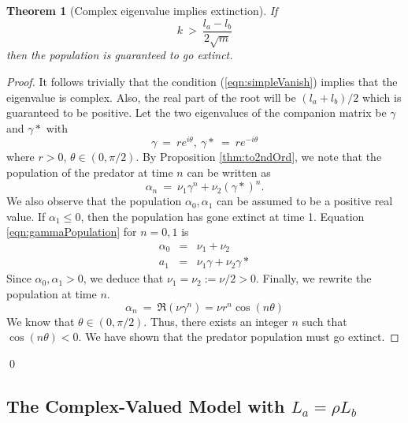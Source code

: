 \documentclass[11pt,reqno]{amsart}
\numberwithin{equation}{section}
\theoremstyle{plain}
\newtheorem{theorem}[thm]{Theorem}
\begin{document}
\begin{theorem}[Complex eigenvalue implies extinction]
If 
\begin{equation}\label{eqn:simpleVanish}
    k \ > \  \frac {l_a - l_b} {2\sqrt{m}}
\end{equation}
then the population is guaranteed to go extinct. 
\end{theorem}
\begin{proof}
    It follows trivially that the condition (\ref{eqn:simpleVanish}) 
    implies that the eigenvalue is complex. Also, the real part of the root will be $(l_a + l_b)/2$ which is guaranteed to be positive. Let the two eigenvalues of the companion matrix be $\gamma$ and $\gamma *$ with 
    \begin{equation}
    \gamma \ = \ r e^{i \theta} ,\ \gamma* \ = \ r e^{-i \theta} 
    \end{equation}
    where $r > 0$,
    $\theta \in (0, \pi/2)$. By Proposition \ref{thm:to2ndOrd}, we note that the population of 
    the predator at time $n$ can be written as 
    \begin{equation}\label{eqn:gammaPopulation}
    \alpha_n \ = \ \nu_1 \gamma^n + \nu_2 (\gamma*)^n.
    \end{equation}
    We also observe that the population $\alpha_0, \alpha_1$ can be assumed to be a positive real value. If $\alpha_1 \leq 0$, then the population has gone extinct at time 1. 
    Equation \ref{eqn:gammaPopulation} for $n = 0, 1$ is 
    \begin{eqnarray}
    \alpha_0 & = & \nu_1 + \nu_2 \nonumber\\ 
    a_1 & = & \nu_1\gamma + \nu_2\gamma*
    \end{eqnarray}
    Since $\alpha_0, \alpha_1 > 0$, we deduce that $\nu_1 = \nu_2 := \nu/2 > 0$. Finally, we rewrite the population at time $n$. 
    \begin{equation}
    \alpha_n \ = \ \Re (\nu \gamma ^n) = \nu r^n \cos(n\theta)
    \end{equation}
    We know that $\theta \in (0, \pi / 2)$. Thus, there exists 
    an integer $n$ such that $\cos(n\theta) < 0$. We have shown that the predator population must go extinct. 
\end{proof}
\hfill \qed

\subsection{The Complex-Valued Model with $L_a = \rho L_b$}
\end{document}
